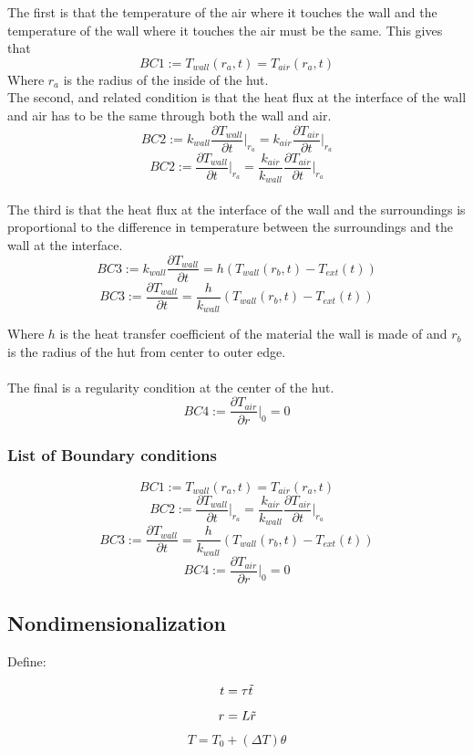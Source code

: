 \documentclass{article}
\begin{document}
The first is that the temperature of the air where it touches the wall and the temperature of the wall where it touches the air must be the same. This gives that 
\[BC1:=T_{wall}(r_a, t) = T_{air}(r_a, t)\]
Where $r_a$ is the radius of the inside of the hut. \\

The second, and related condition is that the heat flux at the interface of the wall and air has to be the same through both the wall and air.
\[BC2:= k_{wall}\frac{\partial T_{wall}}{\partial t}\bigg|_{r_a} = k_{air}\frac{\partial T_{air}}{\partial t}\bigg|_{r_a} \]
\[BC2:= \frac{\partial T_{wall}}{\partial t}\bigg|_{r_a} = \frac{k_{air}}{k_{wall}}\frac{\partial T_{air}}{\partial t}\bigg|_{r_a} \] \\

The third is that the heat flux at the interface of the wall and the surroundings is proportional to the difference in temperature between the surroundings and the wall at the interface.
\[BC3:= k_{wall} \frac{\partial T_{wall}}{\partial t} = h(T_{wall}(r_b,t) - T_{ext}(t))\]
\[BC3:=  \frac{\partial T_{wall}}{\partial t} = \frac{h}{k_{wall}}(T_{wall}(r_b,t) - T_{ext}(t))\]

Where $h$ is the heat transfer coefficient of the material the wall is made of and $r_b$ is the radius of the hut from center to outer edge. \\ \\ 

The final is a regularity condition at the center of the hut.
\[BC4:= \frac{\partial T_{air}}{\partial r}\bigg|_0 = 0\]

\subsubsection{List of Boundary conditions}
\[BC1:= T_{wall}(r_a, t) = T_{air}(r_a, t)\]
\[BC2:= \frac{\partial T_{wall}}{\partial t}\bigg|_{r_a} = \frac{k_{air}}{k_{wall}} \frac{\partial T_{air}}{\partial t}\bigg|_{r_a}\]
\[BC3:=  \frac{\partial T_{wall}}{\partial t} = \frac{h}{k_{wall}}(T_{wall}(r_b,t) - T_{ext}(t))\]
\[BC4:=\frac{\partial T_{air}}{\partial r}\bigg|_0 = 0\]

\subsection{Nondimensionalization}

Define:

\[t = \tau \Tilde{t}\]
\[r = L \Tilde{r}\]
\[T = T_0 + (\Delta T)\theta\]
\end{document}

